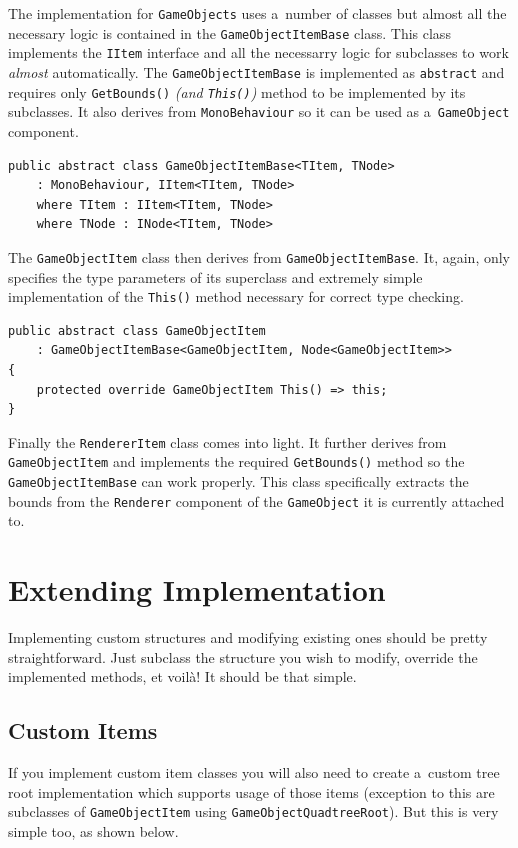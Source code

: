 \documentclass{article}
\begin{document}
The implementation for \texttt{GameObjects} uses a~number of classes but almost all the necessary logic is contained in the \texttt{GameObjectItemBase} class.
This class implements the \texttt{IItem} interface and all the necessarry logic for subclasses to work \textit{almost} automatically.
The \texttt{GameObjectItemBase} is implemented as \texttt{abstract} and requires only \texttt{GetBounds()} \textit{(and \texttt{This()})} method to be implemented by its subclasses.
It also derives from \texttt{MonoBehaviour} so it can be used as a~\texttt{GameObject} component.

\begin{verbatim}
public abstract class GameObjectItemBase<TItem, TNode>
    : MonoBehaviour, IItem<TItem, TNode>
    where TItem : IItem<TItem, TNode>
    where TNode : INode<TItem, TNode>
\end{verbatim}

The \texttt{GameObjectItem} class then derives from \texttt{GameObjectItemBase}.
It, again, only specifies the type parameters of its superclass and extremely simple implementation of the \texttt{This()} method necessary for correct type checking.

\begin{verbatim}
public abstract class GameObjectItem
    : GameObjectItemBase<GameObjectItem, Node<GameObjectItem>>
{
    protected override GameObjectItem This() => this;
}
\end{verbatim}

Finally the \texttt{RendererItem} class comes into light.
It further derives from \texttt{GameObjectItem} and implements the required \texttt{GetBounds()} method so the \texttt{GameObjectItemBase} can work properly.
This class specifically extracts the bounds from the \texttt{Renderer} component of the \texttt{GameObject} it is currently attached to.

\section{Extending Implementation} \label{extensions}
Implementing custom structures and modifying existing ones should be pretty straightforward.
Just subclass the structure you wish to modify, override the implemented methods, et voilà!
It should be that simple.

\subsection{Custom Items} \label{extensions:custom_items}
If you implement custom item classes you will also need to create a~custom tree root implementation which supports usage of those items (exception to this are subclasses of \texttt{GameObjectItem} using \texttt{GameObjectQuadtreeRoot}).
But this is very simple too, as shown below.
\end{document}
